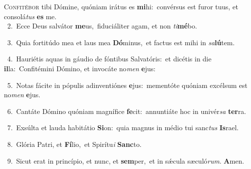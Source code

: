 \lettrine{\initial\textcolor{\initialcolor}{C}}{onfitébor} tibi Dómine, quóniam irátus es \textbf{mi}\-hi:~\star convérsus est furor tuus, et consolá\textit{tus} \textbf{es} me.\\
{\numbfont\textcolor{\numbcolor}{~2.}}~Ecce Deus salvátor \textbf{me}\-us,~\star fiduciáliter agam, et non \textit{ti}\-\textbf{mé}bo.\par
{\numbfont\textcolor{\numbcolor}{~3.}}~Quia fortitúdo mea et laus mea \textbf{Dó}\-minus,~\star et factus est mihi in \textit{sa}\-\textbf{lú}tem.\par
{\numbfont\textcolor{\numbcolor}{~4.}}~Hauriétis aquas in gáudio de fóntibus Salvatóris:~\dagger et dicétis in die \textbf{il}\-la:~\star Confitémini Dómino, et invocáte no\textit{men} \textbf{e}\-jus:\par
{\numbfont\textcolor{\numbcolor}{~5.}}~Notas fácite in pópulis adinventiónes \textbf{e}\-jus:~\star mementóte quóniam excélsum est no\textit{men} \textbf{e}\-jus.\par
{\numbfont\textcolor{\numbcolor}{~6.}}~Cantáte Dómino quóniam magnífice \textbf{fe}\-cit:~\star annuntiáte hoc in univér\textit{sa} \textbf{ter}\-ra.\par
{\numbfont\textcolor{\numbcolor}{~7.}}~Exsúlta et lauda habitátio \textbf{Si}\-on:~\star quia magnus in médio tui sanc\textit{tus} \textbf{Is}\-rael.\par
{\numbfont\textcolor{\numbcolor}{~8.}}~Glória Patri, et \textbf{Fí}\-lio,~\star et Spirítu\textit{i} \textbf{Sanc}\-to.\par
{\numbfont\textcolor{\numbcolor}{~9.}}~Sicut erat in princípio, et nunc, et \textbf{sem}\-per,~\star et in sǽcula sæculó\-\textit{rum}\-. \textbf{A}\-men.\par
